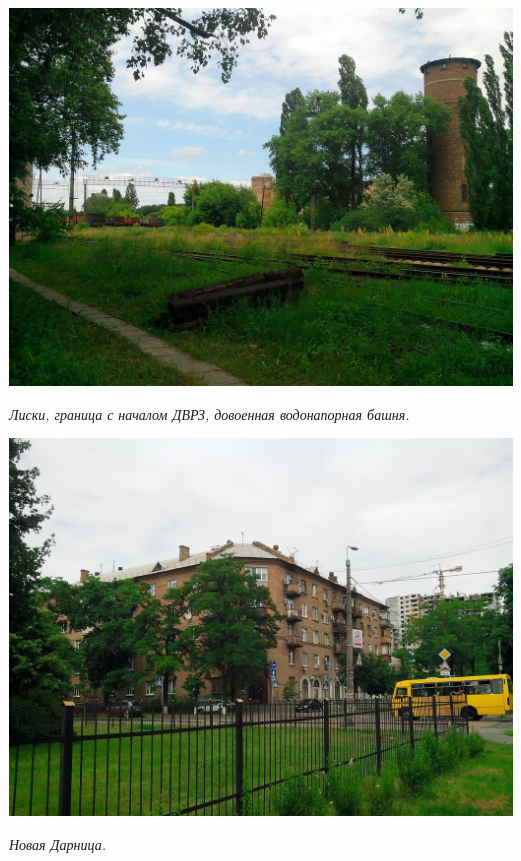 \begin{center}
\includegraphics[width=0.95\linewidth]{lpix/IMG_20160613_134918.jpg}

\textit{Лиски, граница с началом ДВРЗ, довоенная водонапорная башня.}
\end{center}



\begin{center}
\includegraphics[width=\linewidth]{lpix/IMG_20160613_143111.jpg}

\textit{Новая Дарница.}
\end{center}


